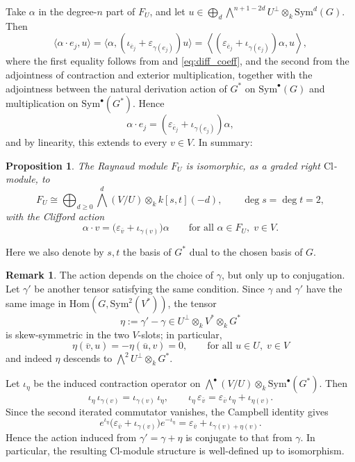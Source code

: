 \documentclass[12pt, letterpaper]{amsart}
\newtheorem{proposition}[theorem]{Proposition}
\theoremstyle{definition}
\newtheorem{remark}[theorem]{Remark}
\newcommand{\ga}{\gamma}
\def\rHom{\mathrm{Hom} }
\def\Sym{\mathrm{Sym} }
\def\Cl{\mathrm{Cl}}
\begin{document}
Take \(\alpha\) in the degree-\(n\) part of \(F_U\), and let \(u\in\bigoplus_d\bigwedge^{n+1-2d}U^\perp\otimes_k\Sym^d(G).\) Then
\[
\langle\alpha\cdot e_j,u\rangle = \langle\alpha,(\iota_{\overline e_j}+\varepsilon_{\ga(e_j)})u\rangle = \left\langle (\varepsilon_{\overline e_j}+\iota_{\ga(e_j)})\alpha,u\right\rangle,
\]
where the first equality follows from \cite[Lemma~3.5]{ES25} and \eqref{eq:diff_coeff}, and the second from the adjointness of contraction and exterior multiplication, together with the adjointness between the natural derivation action of \(G^*\) on \(\Sym^\bullet(G)\) and multiplication on \(\Sym^\bullet(G^*)\). Hence
\begin{equation}\label{eqn:Cliffordaction}
\alpha\cdot e_j=(\varepsilon_{\overline e_j}+\iota_{\ga(e_j)})\alpha,
\end{equation}
and by linearity, this extends to every \(v\in V\). In summary:

\begin{proposition}\label{prop:Ray_act}
The Raynaud module \(F_U\) is isomorphic, as a graded right \(\Cl\)-module, to
\[F_U\cong \bigoplus_{d\ge0}\bigwedge^d(V/U)\otimes_k k[s,t](-d), \qquad \deg s=\deg t=2,\]
with the Clifford action
\[\alpha\cdot v=\bigl(\varepsilon_{\overline v}+\iota_{\ga(v)}\bigr)\alpha \qquad\text{for all }\alpha\in F_U,\;v\in V.\]
\end{proposition}

Here we also denote by \(s,t\) the basis of \(G^*\) dual to the chosen basis of \(G\).

\begin{remark}
The action depends on the choice of \(\ga\), but only up to conjugation. Let \(\ga'\) be another tensor satisfying the same condition. Since \(\ga\) and \(\ga'\) have the same image in \(\rHom(G,\Sym^2(V^*))\), the tensor
\[\eta:=\ga'-\ga\in U^\perp\otimes_k V^*\otimes_k G^*\]
is skew-symmetric in the two \(V\)-slots; in particular,
\[\eta(\overline v,u)=-\eta(\overline u,v)=0,\qquad\text{for all }u\in U,\;v\in V\]
and indeed \(\eta\) descends to \(\bigwedge^2U^\perp\otimes_k G^*\).

Let \(\iota_\eta\) be the induced contraction operator on \(\bigwedge^\bullet(V/U)\otimes_k \Sym^\bullet(G^*)\). Then
\[\iota_\eta\,\iota_{\ga(v)}=\iota_{\ga(v)}\,\iota_\eta, \qquad \iota_\eta\,\varepsilon_{\overline v} = \varepsilon_{\overline v}\,\iota_\eta+\iota_{\eta(v)}.\]
Since the second iterated commutator vanishes, the Campbell identity gives
\[e^{\iota_\eta}\bigl(\varepsilon_{\overline v}+\iota_{\ga(v)}\bigr)e^{-\iota_\eta} = \varepsilon_{\overline v}+\iota_{\ga(v)+\eta(v)}.\]
Hence the action induced from \(\ga'=\ga+\eta\) is conjugate to that from \(\ga\). In particular, the resulting \(\Cl\)-module structure is well-defined up to isomorphism.
\end{remark}
\end{document}
